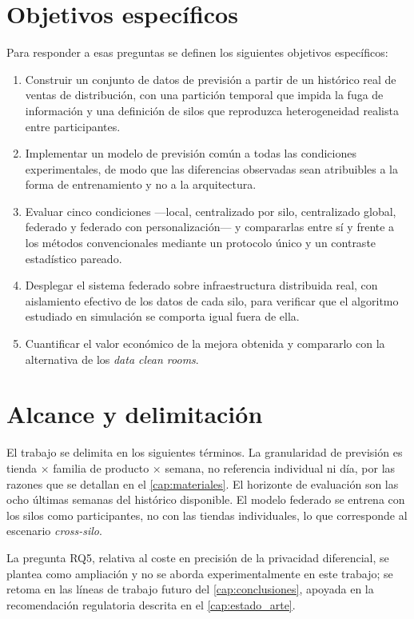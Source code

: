 \section{Objetivos específicos}

Para responder a esas preguntas se definen los siguientes objetivos específicos:

\begin{enumerate}
  \item Construir un conjunto de datos de previsión a partir de un histórico real de ventas de
    distribución, con una partición temporal que impida la fuga de información y una definición de
    silos que reproduzca heterogeneidad realista entre participantes.

  \item Implementar un modelo de previsión común a todas las condiciones experimentales, de modo
    que las diferencias observadas sean atribuibles a la forma de entrenamiento y no a la
    arquitectura.

  \item Evaluar cinco condiciones —local, centralizado por silo, centralizado global, federado y
    federado con personalización— y compararlas entre sí y frente a los métodos convencionales
    mediante un protocolo único y un contraste estadístico pareado.

  \item Desplegar el sistema federado sobre infraestructura distribuida real, con aislamiento
    efectivo de los datos de cada silo, para verificar que el algoritmo estudiado en simulación se
    comporta igual fuera de ella.

  \item Cuantificar el valor económico de la mejora obtenida y compararlo con la alternativa de los
    \emph{data clean rooms}.
\end{enumerate}

\section{Alcance y delimitación}

El trabajo se delimita en los siguientes términos. La granularidad de previsión es tienda ×
familia de producto × semana, no referencia individual ni día, por las razones que se detallan en
el \cref{cap:materiales}. El horizonte de evaluación son las ocho últimas semanas del histórico
disponible. El modelo federado se entrena con los silos como participantes, no con las tiendas
individuales, lo que corresponde al escenario \emph{cross-silo}.

La pregunta RQ5, relativa al coste en precisión de la privacidad diferencial, se plantea como
ampliación y no se aborda experimentalmente en este trabajo; se retoma en las líneas de trabajo
futuro del \cref{cap:conclusiones}, apoyada en la recomendación regulatoria descrita en el
\cref{cap:estado_arte}.
